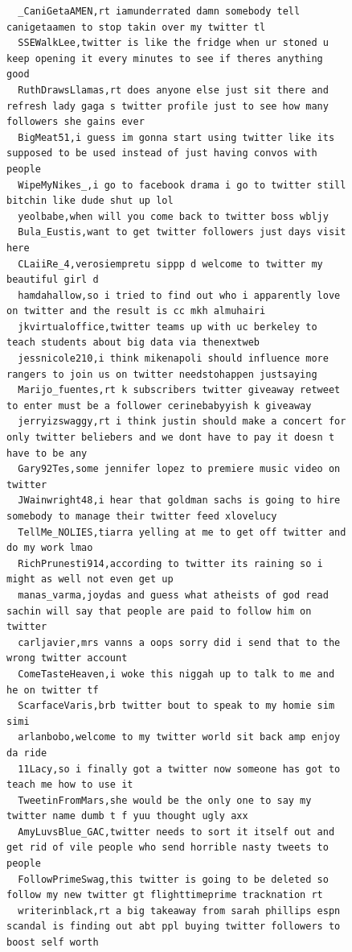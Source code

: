 \begin{figure}[htpb]
\begin{verbatim}
  _CaniGetaAMEN,rt iamunderrated damn somebody tell canigetaamen to stop takin over my twitter tl
  SSEWalkLee,twitter is like the fridge when ur stoned u keep opening it every minutes to see if theres anything good
  RuthDrawsLlamas,rt does anyone else just sit there and refresh lady gaga s twitter profile just to see how many followers she gains ever
  BigMeat51,i guess im gonna start using twitter like its supposed to be used instead of just having convos with people
  WipeMyNikes_,i go to facebook drama i go to twitter still bitchin like dude shut up lol
  yeolbabe,when will you come back to twitter boss wbljy
  Bula_Eustis,want to get twitter followers just days visit here
  CLaiiRe_4,verosiempretu sippp d welcome to twitter my beautiful girl d
  hamdahallow,so i tried to find out who i apparently love on twitter and the result is cc mkh almuhairi
  jkvirtualoffice,twitter teams up with uc berkeley to teach students about big data via thenextweb
  jessnicole210,i think mikenapoli should influence more rangers to join us on twitter needstohappen justsaying
  Marijo_fuentes,rt k subscribers twitter giveaway retweet to enter must be a follower cerinebabyyish k giveaway
  jerryizswaggy,rt i think justin should make a concert for only twitter beliebers and we dont have to pay it doesn t have to be any
  Gary92Tes,some jennifer lopez to premiere music video on twitter
  JWainwright48,i hear that goldman sachs is going to hire somebody to manage their twitter feed xlovelucy
  TellMe_NOLIES,tiarra yelling at me to get off twitter and do my work lmao
  RichPrunesti914,according to twitter its raining so i might as well not even get up
  manas_varma,joydas and guess what atheists of god read sachin will say that people are paid to follow him on twitter
  carljavier,mrs vanns a oops sorry did i send that to the wrong twitter account
  ComeTasteHeaven,i woke this niggah up to talk to me and he on twitter tf
  ScarfaceVaris,brb twitter bout to speak to my homie sim simi
  arlanbobo,welcome to my twitter world sit back amp enjoy da ride
  11Lacy,so i finally got a twitter now someone has got to teach me how to use it
  TweetinFromMars,she would be the only one to say my twitter name dumb t f yuu thought ugly axx
  AmyLuvsBlue_GAC,twitter needs to sort it itself out and get rid of vile people who send horrible nasty tweets to people
  FollowPrimeSwag,this twitter is going to be deleted so follow my new twitter gt flighttimeprime tracknation rt
  writerinblack,rt a big takeaway from sarah phillips espn scandal is finding out abt ppl buying twitter followers to boost self worth

\end{verbatim}
\end{figure}
